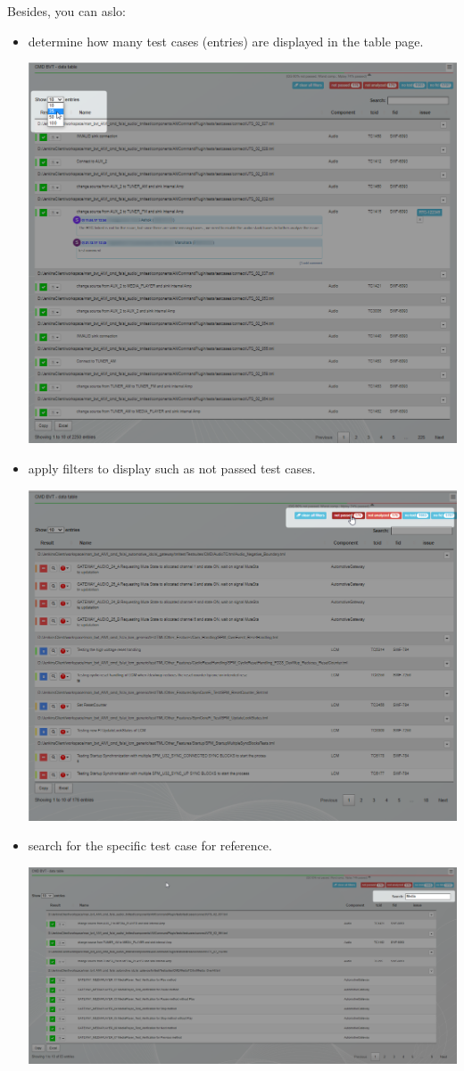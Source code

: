 Besides, you can aslo:
\begin{itemize}
   \item determine how many test cases (entries) are displayed in the table page.

         \includegraphics[width=0.6\linewidth]{./pictures/datatable/change_number_entries.png}
         
   \item apply filters to display such as not passed test cases.
   
         \includegraphics[width=0.6\linewidth]{./pictures/datatable/apply_filter.png}

   \item search for the specific test case for reference.
   
         \includegraphics[width=0.6\linewidth]{./pictures/datatable/search.png}


\end{itemize}
